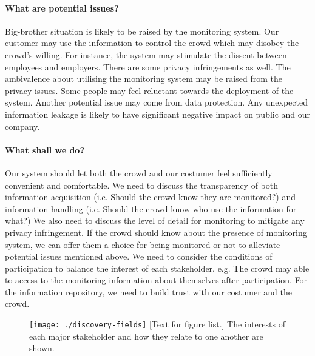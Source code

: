 \documentclass[12pt, oneside]{article}
\begin{document}
\paragraph{What are potential issues?} Big-brother situation is likely to be raised by the monitoring system. Our customer may use the information to control the crowd which may disobey the crowd's willing. For instance, the system may stimulate the dissent between employees and employers. There are some privacy infringements as well. The ambivalence about utilising the monitoring system may be raised from the privacy issues. Some people may feel reluctant towards the deployment of the system. Another potential issue may come from data protection. Any unexpected information leakage is likely to have significant negative impact on public and our company.

\paragraph{What shall we do?} Our system should let both the crowd and our costumer feel sufficiently convenient and comfortable. We need to discuss the transparency of both information acquisition (i.e. Should the crowd know they are monitored?) and information handling (i.e. Should the crowd know who use the information for what?) We also need to discuss the level of detail for monitoring to mitigate any privacy infringement. If the crowd should know about the presence of monitoring system, we can offer them a choice for being monitored or not to alleviate potential issues mentioned above.  We need to consider the conditions of participation to balance the interest of each stakeholder. e.g. The crowd may able to access to the monitoring information about themselves after participation. For the information repository, we need to build trust with our costumer and the crowd.

\begin{figure}
\centering
\texttt{[image: ./discovery-fields]}
{[Text for figure list.]{\label{fig:fields} 
The interests of each major stakeholder and how they relate to one another are shown.}}
\end{figure}
\end{document}
